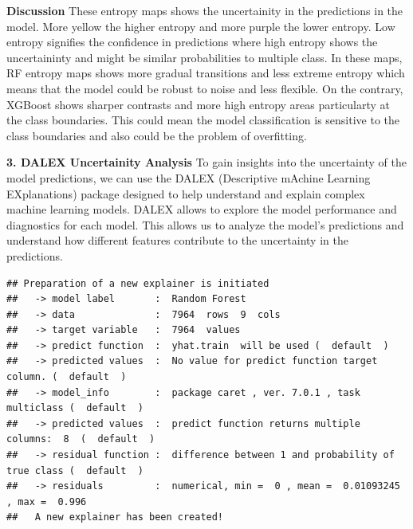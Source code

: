 \documentclass[
]{article}
\newenvironment{Shaded}{\begin{snugshade}}{\end{snugshade}}
\newcommand{\AttributeTok}[1]{\textcolor[rgb]{0.13,0.29,0.53}{#1}}
\newcommand{\CommentTok}[1]{\textcolor[rgb]{0.56,0.35,0.01}{\textit{#1}}}
\newcommand{\ControlFlowTok}[1]{\textcolor[rgb]{0.13,0.29,0.53}{\textbf{#1}}}
\newcommand{\FunctionTok}[1]{\textcolor[rgb]{0.13,0.29,0.53}{\textbf{#1}}}
\newcommand{\NormalTok}[1]{#1}
\newcommand{\OtherTok}[1]{\textcolor[rgb]{0.56,0.35,0.01}{#1}}
\newcommand{\SpecialCharTok}[1]{\textcolor[rgb]{0.81,0.36,0.00}{\textbf{#1}}}
\newcommand{\StringTok}[1]{\textcolor[rgb]{0.31,0.60,0.02}{#1}}
\begin{document}
\textbf{Discussion} These entropy maps shows the uncertainity in the
predictions in the model. More yellow the higher entropy and more purple
the lower entropy. Low entropy signifies the confidence in predictions
where high entropy shows the uncertaininty and might be similar
probabilities to multiple class. In these maps, RF entropy maps shows
more gradual transitions and less extreme entropy which means that the
model could be robust to noise and less flexible. On the contrary,
XGBoost shows sharper contrasts and more high entropy areas particularty
at the class boundaries. This could mean the model classification is
sensitive to the class boundaries and also could be the problem of
overfitting.

\textbf{3. DALEX Uncertainity Analysis} To gain insights into the
uncertainty of the model predictions, we can use the DALEX (Descriptive
mAchine Learning EXplanations) package designed to help understand and
explain complex machine learning models. DALEX allows to explore the
model performance and diagnostics for each model. This allows us to
analyze the model's predictions and understand how different features
contribute to the uncertainty in the predictions.

\begin{Shaded}
\end{Shaded}

\begin{verbatim}
## Preparation of a new explainer is initiated
##   -> model label       :  Random Forest 
##   -> data              :  7964  rows  9  cols 
##   -> target variable   :  7964  values 
##   -> predict function  :  yhat.train  will be used (  default  )
##   -> predicted values  :  No value for predict function target column. (  default  )
##   -> model_info        :  package caret , ver. 7.0.1 , task multiclass (  default  ) 
##   -> predicted values  :  predict function returns multiple columns:  8  (  default  ) 
##   -> residual function :  difference between 1 and probability of true class (  default  )
##   -> residuals         :  numerical, min =  0 , mean =  0.01093245 , max =  0.996  
##   A new explainer has been created!
\end{verbatim}
\end{document}
